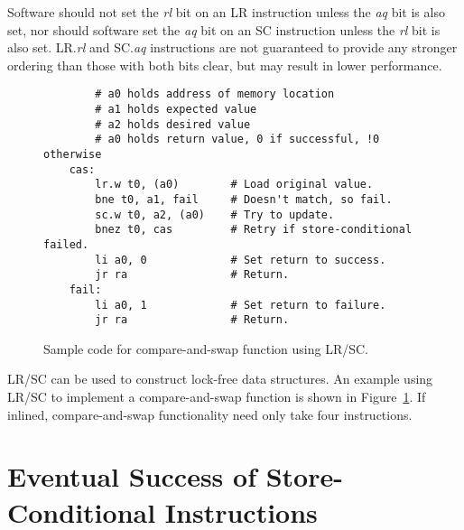 Software should not set the {\em rl} bit on an LR instruction unless the {\em
aq} bit is also set, nor should software set the {\em aq} bit on an SC
instruction unless the {\em rl} bit is also set.  LR.{\em rl} and SC.{\em aq}
instructions are not guaranteed to provide any stronger ordering than those
with both bits clear, but may result in lower performance.

\begin{figure}[h!]
\begin{center}
\begin{verbatim}
        # a0 holds address of memory location
        # a1 holds expected value
        # a2 holds desired value
        # a0 holds return value, 0 if successful, !0 otherwise
    cas:
        lr.w t0, (a0)        # Load original value.
        bne t0, a1, fail     # Doesn't match, so fail.
        sc.w t0, a2, (a0)    # Try to update.
        bnez t0, cas         # Retry if store-conditional failed.
        li a0, 0             # Set return to success.
        jr ra                # Return.
    fail:
        li a0, 1             # Set return to failure.
        jr ra                # Return.
\end{verbatim}
\end{center}
\caption{Sample code for compare-and-swap function using LR/SC.}
\label{cas}
\end{figure}

LR/SC can be used to construct lock-free data structures.  An example
using LR/SC to implement a compare-and-swap function is shown in
Figure~\ref{cas}.  If inlined, compare-and-swap functionality need
only take four instructions.

\section{Eventual Success of Store-Conditional Instructions}
\label{sec:lrscseq}

